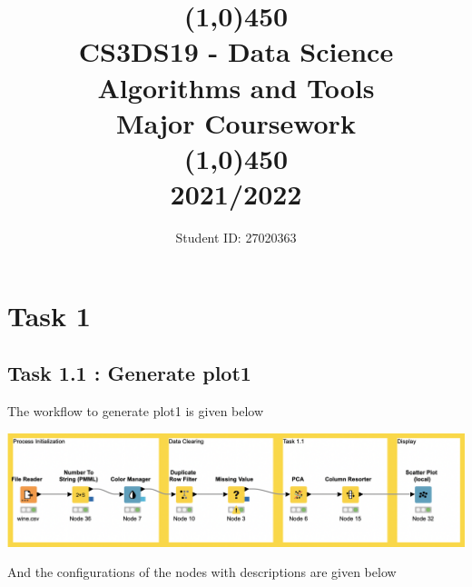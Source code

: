 \documentclass[11pt]{article}
\title{\line(1,0){450}\\ CS3DS19 - Data Science Algorithms and Tools \\ \large{Major Coursework }  \\\line(1,0){450} \\2021/2022}
\author{Student ID: 27020363}
\begin{document}
	\maketitle
	\pagebreak
	
	\section*{Task 1}
		\subsection*{Task 1.1 : Generate plot1}
			The workflow to generate plot1 is given below
			\iftrue
			\begin{center}
				\includegraphics[scale=0.5]{res/t1/t11/t11-workflow}
			\end{center}
			\fi
			And the configurations of the nodes with descriptions are given below
			\iftrue
\end{document}
